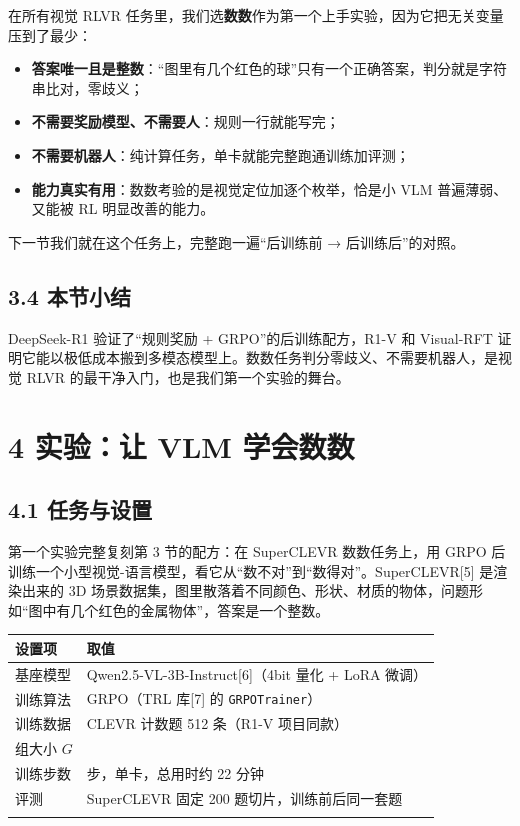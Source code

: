 \documentclass[
  chinese,
]{ctexart}
\providecommand{\tightlist}{%
  \setlength{\itemsep}{0pt}\setlength{\parskip}{0pt}}
\begin{document}
在所有视觉 RLVR
任务里，我们选\textbf{数数}作为第一个上手实验，因为它把无关变量压到了最少：

\begin{itemize}
\tightlist
\item
  \textbf{答案唯一且是整数}：``图里有几个红色的球''只有一个正确答案，判分就是字符串比对，零歧义；
\item
  \textbf{不需要奖励模型、不需要人}：规则一行就能写完；
\item
  \textbf{不需要机器人}：纯计算任务，单卡就能完整跑通训练加评测；
\item
  \textbf{能力真实有用}：数数考验的是视觉定位加逐个枚举，恰是小 VLM
  普遍薄弱、又能被 RL 明显改善的能力。
\end{itemize}

下一节我们就在这个任务上，完整跑一遍``后训练前 → 后训练后''的对照。

\subsection{3.4 本节小结}\label{ux672cux8282ux5c0fux7ed3-2}

DeepSeek-R1 验证了``规则奖励 + GRPO''的后训练配方，R1-V 和 Visual-RFT
证明它能以极低成本搬到多模态模型上。数数任务判分零歧义、不需要机器人，是视觉
RLVR 的最干净入门，也是我们第一个实验的舞台。

\section{4 实验：让 VLM
学会数数}\label{ux5b9eux9a8cux8ba9-vlm-ux5b66ux4f1aux6570ux6570}

\subsection{4.1 任务与设置}\label{ux4efbux52a1ux4e0eux8bbeux7f6e}

第一个实验完整复刻第 3 节的配方：在 SuperCLEVR 数数任务上，用 GRPO
后训练一个小型视觉-语言模型，看它从``数不对''到``数得对''。SuperCLEVR{[}5{]}
是渲染出来的 3D
场景数据集，图里散落着不同颜色、形状、材质的物体，问题形如``图中有几个红色的金属物体''，答案是一个整数。

\begin{center}
\begin{tabular}{@{}>{\raggedright\arraybackslash}p{} >{\raggedright\arraybackslash}p{}@{}}
\toprule\noalign{}
设置项 & 取值 \\
\midrule\noalign{}
基座模型 & Qwen2.5-VL-3B-Instruct{[}6{]}（4bit 量化 + LoRA 微调） \\
训练算法 & GRPO（TRL 库{[}7{]} 的 \texttt{GRPOTrainer}） \\
训练数据 & CLEVR 计数题 512 条（R1-V 项目同款） \\
组大小 \(G\) & 4 \\
训练步数 & 300 步，单卡，总用时约 22 分钟 \\
评测 & SuperCLEVR 固定 200 题切片，训练前后同一套题 \\
\bottomrule\noalign{}
\end{tabular}
\end{center}
\end{document}

